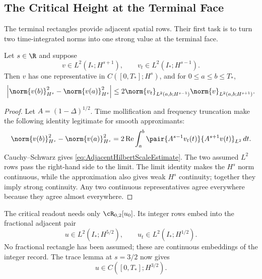 \subsection{The Critical Height at the Terminal Face}\label{sub:TheCriticalHeightAtTheTerminalFace}

The terminal rectangles provide adjacent spatial rows.  Their first task is to
turn two time-integrated norms into one strong value at the terminal face.

\begin{lemma}\label{lem:AdjacentHilbertScaleTrace}
Let \(s\in\R\) and suppose
\[
  v\in L^2(I_*;H^{s+1}),
  \qquad
  v_t\in L^2(I_*;H^{s-1}).
\]
Then \(v\) has one representative in \(C([0,T_*];H^s)\), and for
\(0\leq a\leq b\leq T_*\),
\begin{equation}\label{eq:AdjacentHilbertScaleEstimate}
  \left|
  \norm{v(b)}_{H^s}^{2}
  -\norm{v(a)}_{H^s}^{2}
  \right|
  \leq
  2\norm{v_t}_{L^2(a,b;H^{s-1})}
  \norm{v}_{L^2(a,b;H^{s+1})}.
\end{equation}
\end{lemma}

\begin{proof}
Let \(A=(1-\Delta)^{1/2}\).  Time mollification and frequency truncation make
the following identity legitimate for smooth approximants:
\begin{equation}\label{eq:AdjacentHilbertScaleIdentity}
  \norm{v(b)}_{H^s}^{2}
  -\norm{v(a)}_{H^s}^{2}
  =
  2\operatorname{Re}\int_a^b
  \pair{A^{s-1}v_t(t)}{A^{s+1}v(t)}_{L^2}
  \,dt.
\end{equation}
Cauchy--Schwarz gives \eqref{eq:AdjacentHilbertScaleEstimate}.  The two assumed
\(L^2\) rows pass the right-hand side to the limit.  The limit identity makes
the \(H^s\) norm continuous, while the approximation also gives weak
\(H^s\) continuity; together they imply strong continuity.  Any two continuous
representatives agree everywhere because they agree almost everywhere.
\end{proof}

The critical readout needs only \(\cR_{0,2}[u_0]\).  Its integer rows embed into
the fractional adjacent pair
\begin{equation}\label{eq:SectionThreeCriticalAdjacentPair}
  u\in L^2(I_*;H^{5/2}),
  \qquad
  u_t\in L^2(I_*;H^{1/2}).
\end{equation}
No fractional rectangle has been assumed; these are continuous embeddings of
the integer record.  The trace lemma at \(s=3/2\) now gives
\begin{equation}\label{eq:SectionThreeCriticalVelocityTrace}
  u\in C([0,T_*];H^{3/2}).
\end{equation}

